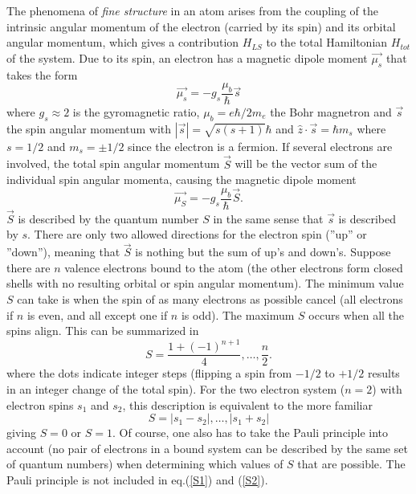 \documentclass[a4paper]{article}
\begin{document}
The phenomena of \textit{fine structure} in an atom arises from the coupling of the intrinsic angular momentum of the electron (carried by its spin) and its orbital angular momentum, which gives a contribution $H_{LS}$ to the total Hamiltonian $H_{tot}$ of the system. Due to its spin, an electron has a magnetic dipole moment $\vec{\mu_s}$ that takes the form
\begin{equation}
\vec{\mu_s} = -g_s \frac{\mu_b}{\hbar} \vec{s}
\end{equation}
where $g_s \approx 2$ is the gyromagnetic ratio, $\mu_b = e \hbar / 2m_e$ the Bohr magnetron and $\vec{s}$ the spin angular momentum with $|\vec{s}|=\sqrt{s(s+1)} \hbar$ and $\hat{z} \cdot \vec{s} = \hbar m_s$ where $s=1/2$ and $m_s = \pm 1/2$ since the electron is a fermion. If several electrons are involved, the total spin angular momentum $\vec{S}$ will be the vector sum of the individual spin angular momenta, causing the magnetic dipole moment
\begin{equation}
\vec{\mu_S} = -g_s \frac{\mu_b}{\hbar} \vec{S}. 	\label{muS}
\end{equation}
$\vec{S}$ is described by the quantum number $S$ in the same sense that $\vec{s}$ is described by $s$. There are only two allowed directions for the electron spin (''up'' or ''down''), meaning that $\vec{S}$ is nothing but the sum of up's and down's. Suppose there are $n$ valence electrons bound to the atom (the other electrons form closed shells with no resulting orbital or spin angular momentum). The minimum value $S$ can take is when the spin of as many electrons as possible cancel (all electrons if $n$ is even, and all except one if $n$ is odd). The maximum $S$ occurs when all the spins align. This can be summarized in
\begin{equation}
S = \frac{1+(-1)^{n+1}}{4} , \dots , \frac{n}{2}. \label{S1}
\end{equation}
where the dots indicate integer steps (flipping a spin from $-1/2$ to $+1/2$ results in an integer change of the total spin). For the two electron system ($n=2$) with electron spins $s_1$ and $s_2$, this description is equivalent to the more familiar
\begin{equation}
S = |s_1 - s_2|, \dots, |s_1 + s_2|			\label{S2}
\end{equation}
giving $S=0$ or $S=1$. Of course, one also has to take the Pauli principle into account (no pair of electrons in a bound system can be described by the same set of quantum numbers) when determining which values of $S$ that are possible. The Pauli principle is not included in eq.(\ref{S1}) and (\ref{S2}).  
\end{document}
